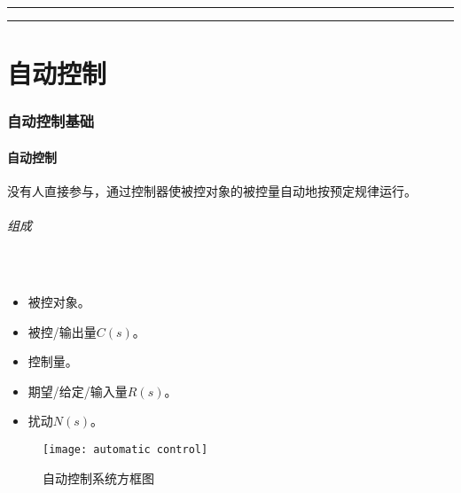\documentclass[
12pt, %
a4paper, 
oneside, %
headinclude,footinclude, %
]{scrartcl}
\title{\normalfont\spacedallcaps{控制}}
\date{}
\begin{document}
\maketitle
\newpage
\hypertarget{toc}{}
\begingroup
\begin{multicols}{2}
\tableofcontents
\end{multicols}
\endgroup
\newpage
\begingroup
\begin{multicols}{2}
\listoffigures
\end{multicols}
\endgroup
\hrule
\begingroup
\begin{multicols}{2}
\listoftables
\end{multicols}
\endgroup
\hrule
\begingroup
\begin{multicols}{2}
\listoftips
\end{multicols}
\endgroup
\newpage
\part{自动控制}
\section{自动控制基础}
\subsection[自动控制]{自动控制}
没有人直接参与，通过控制器使被控对象的被控量自动地按预定规律运行。
\paragraph{组成}~\\
\begin{minipage}{0.4\textwidth}
\begin{itemize}
\item 被控对象。
\item 被控/输出量$ C(s) $。
\item 控制量。
\item 期望/给定/输入量$ R(s) $。
\item 扰动$ N(s) $。
\end{itemize}
\end{minipage}
\begin{minipage}{0.6\textwidth}
\begin{figure}[H]
\centering 
\texttt{[image: automatic control]} 
\caption{自动控制系统方框图}
\end{figure}
\end{minipage}
\end{document}
